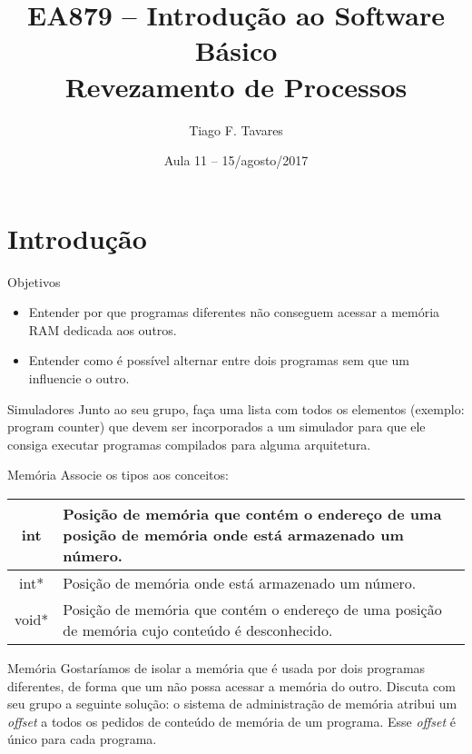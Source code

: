 \documentclass{beamer}
\title[11-contexto-e-preempcao]{EA879 -- Introdução ao Software
Básico\\Revezamento de Processos}
\author{Tiago F. Tavares}
\institute{FEEC -- UNICAMP}
\date{Aula 11 -- 15/agosto/2017}
\begin{document}
\begin{frame}
  \titlepage
\end{frame}


\section{Introdução}

\begin{frame}{Objetivos}
  \Large
  \begin{itemize}
    \item Entender por que programas diferentes não conseguem acessar a memória
      RAM dedicada aos outros.
    \item Entender como é possível alternar entre dois programas sem que um
      influencie o outro.
  \end{itemize}
\end{frame}


\begin{frame}[fragile]{Simuladores}
  \centering
  \Large
  Junto ao seu grupo, faça uma lista com todos os elementos (exemplo: program
  counter) que devem ser
  incorporados a um simulador para que ele consiga executar programas compilados
  para alguma arquitetura.
\end{frame}


\begin{frame}[fragile]{Memória}
  \centering
  \large
  Associe os tipos aos conceitos:
  \begin{tabular}{|c|p{5cm}|} \\ \hline
  int & Posição de memória que contém o endereço de uma posição de memória onde
    está armazenado um número. \\ \hline
  int* & Posição de memória onde está armazenado um número. \\ \hline
  void* & Posição de memória que contém o endereço de uma posição de memória
    cujo conteúdo é desconhecido. \\ \hline
  \end{tabular}
\end{frame}


\begin{frame}[fragile]{Memória}
  \centering
  \large
  Gostaríamos de isolar a memória que é usada por dois programas diferentes, de
  forma que um não possa acessar a memória do outro. Discuta com seu grupo a
  seguinte solução: o sistema de administração de memória atribui um
  \textit{offset} a todos os pedidos de conteúdo de memória de um programa. Esse
  \textit{offset} é único para cada programa.
\end{frame}
\end{document}
